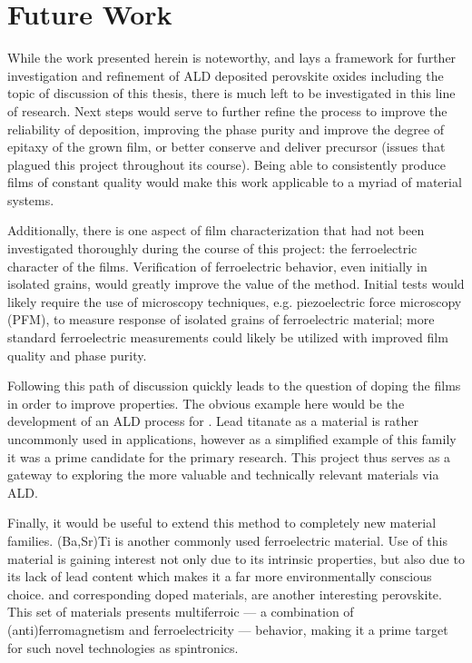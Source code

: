 
\section{Future Work}
\label{sec:Conc-Future}

While the work presented herein is noteworthy, and lays a framework for further investigation and refinement of ALD deposited perovskite oxides including the topic of discussion of this thesis, there is much left to be investigated in this line of research. Next steps would serve to further refine the process to improve the reliability of deposition, improving the phase purity and improve the degree of epitaxy of the grown film, or better conserve and deliver precursor (issues that plagued this project throughout its course). Being able to consistently produce films of constant quality would make this work applicable to a myriad of material systems. 

Additionally, there is one aspect of film characterization that had not been investigated thoroughly during the course of this project: the ferroelectric character of the films. Verification of ferroelectric behavior, even initially in isolated grains, would greatly improve the value of the method. Initial tests would likely require the use of microscopy techniques, e.g. piezoelectric force microscopy (PFM), to measure response of isolated grains of ferroelectric material; more standard ferroelectric measurements could likely be utilized with improved film quality and phase purity. 

Following this path of discussion quickly leads to the question of doping the films in order to improve properties. The obvious example here would be the development of an ALD process for . Lead titanate as a material is rather uncommonly used in applications, however as a simplified example of this family it was a prime candidate for the primary research. This project thus serves as a gateway to exploring the more valuable and technically relevant materials via ALD. 

Finally, it would be useful to extend this method to completely new material families. (Ba,Sr)Ti is another commonly used ferroelectric material. Use of this material is gaining interest not only due to its intrinsic properties, but also due to its lack of lead content which makes it a far more environmentally conscious choice.  and corresponding doped materials, are another interesting perovskite. This set of materials presents multiferroic --- a combination of (anti)ferromagnetism and ferroelectricity --- behavior, making it a prime target for such novel technologies as spintronics. 






